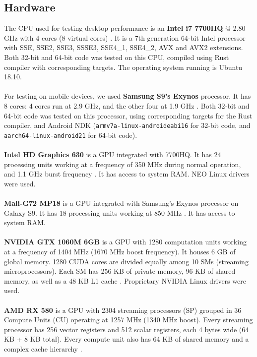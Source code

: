 \subsection{Hardware}
The CPU used for testing desktop performance is an \textbf{Intel i7 7700HQ} @ 2.80 GHz with 4 cores (8 virtual cores) \cite{intel7700hq}. It is a 7th generation 64-bit Intel processor with SSE, SSE2, SSE3, SSSE3, SSE4\_1, SSE4\_2, AVX and AVX2 extensions. Both 32-bit and 64-bit code was tested on this CPU, compiled using Rust compiler with corresponding targets. The operating system running is Ubuntu 18.10.\\
\\
For testing on mobile devices, we used \textbf{Samsung S9's Exynos} processor. It has 8 cores: 4 cores run at 2.9 GHz, and the other four at 1.9 GHz \cite{exynos9810}. Both 32-bit and 64-bit code was tested on this processor, using corresponding targets for the Rust compiler, and Android NDK (\texttt{armv7a-linux-androideabi16} for 32-bit code, and \texttt{aarch64-linux-android21} for 64-bit code).\\
\\
\textbf{Intel HD Graphics 630} is a GPU integrated with 7700HQ. It has 24 processing units working at a frequency of 350 MHz during normal operation, and 1.1 GHz burst frequency \cite{intelhd630}. It has access to system RAM. NEO Linux drivers were used.\\
\\
\textbf{Mali-G72 MP18} is a GPU integrated with Samsung's Exynos processor on Galaxy S9. It has 18 processing units working at 850 MHz \cite{mali}. It has access to system RAM.\\
\\
\textbf{NVIDIA GTX 1060M 6GB} is a GPU with 1280 computation units working at a frequency of 1404 MHz (1670 MHz boost frequency). It houses 6 GB of global memory. 1280 CUDA cores are divided equally among 10 SMs (streaming microprocessors). Each SM has 256 KB of private memory, 96 KB of shared memory, as well as a 48 KB L1 cache \cite{nvidia1060}. Proprietary NVIDIA Linux drivers were used.\\
\\
\textbf{AMD RX 580} is a GPU with 2304 streaming processors (SP) grouped in 36 Compute Units (CU) operating at 1257 MHz (1340 MHz boost). Every streaming processor has 256 vector registers and 512 scalar registers, each 4 bytes wide (64 KB + 8 KB total). Every compute unit also has 64 KB of shared memory and a complex cache hierarchy \cite{amdrx580}.\\

